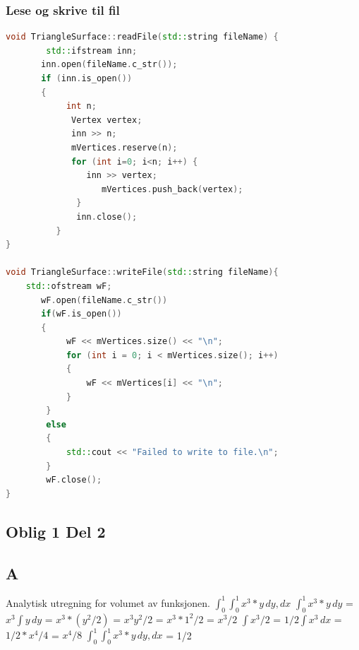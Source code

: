 \documentclass[a4paper,norsk]{article}
\begin{document}
\subsubsection{Lese og skrive til fil}
\begin{lstlisting}[language=C++, caption={trianglesurface.cpp}]
void TriangleSurface::readFile(std::string fileName) {
    	std::ifstream inn;
       inn.open(fileName.c_str());
       if (inn.is_open())
       {
        	int n;
             Vertex vertex;
             inn >> n;
             mVertices.reserve(n);
             for (int i=0; i<n; i++) {
             	inn >> vertex;
                   mVertices.push_back(vertex);
              }
              inn.close();
          }
}

void TriangleSurface::writeFile(std::string fileName){
	std::ofstream wF;
       wF.open(fileName.c_str())
       if(wF.is_open())
       {
        	wF << mVertices.size() << "\n";
            for (int i = 0; i < mVertices.size(); i++)
            {
                wF << mVertices[i] << "\n";
            }
        }
        else
        {
            std::cout << "Failed to write to file.\n";
        }
        wF.close();
}
\end{lstlisting}

\subsection{Oblig 1 Del 2}
\subsection{A}
Analytisk utregning for volumet av funksjonen.
\(\int_{0}^{1} \int_{0}^{1} x^3 * y \,dy, dx\)
\newline
\(\int_{0}^{1} x^3*y \,dy\) = \(x^3\int y \,dy\) = \(x^3 * (y^2/2) \) = \( x^3y^2/2  \) = \( x^3*1^2/2\) = \(x^3/2\)
\newline \(\int x^3/2\) = \(1/2 \int x^3\,dx\) = \(1/2* x^4/4\) = \( x^4/8 \)
\newline\(\int_{0}^{1} \int_{0}^{1} x^3 * y \,dy, dx\) = 1/2
\end{document}
